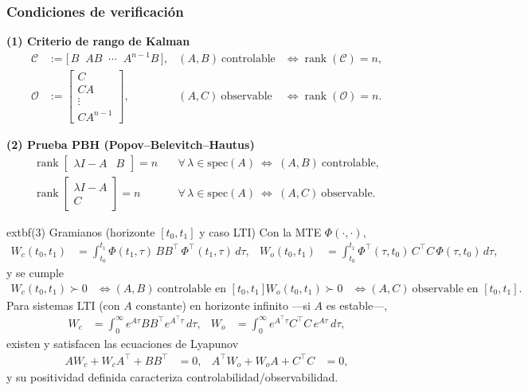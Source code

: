 \documentclass[
  11pt,
  letterpaper,
   addpoints,
   answers
  ]{exam}
\begin{document}
\begin{questions}
\begin{solution}
\subsubsection*{Condiciones de verificación}

\textbf{(1) Criterio de rango de Kalman}
\begin{align}
\mathcal C &:= \big[\,B\;\; AB\;\; \cdots\;\; A^{n-1}B\,\big], 
& (A,B)\ \text{controlable} &\iff \operatorname{rank}(\mathcal C)=n,\\[2mm]
\mathcal O &:= 
\begin{bmatrix}
C\\ CA\\ \vdots\\ CA^{n-1}
\end{bmatrix},
& (A,C)\ \text{observable} &\iff \operatorname{rank}(\mathcal O)=n.
\end{align}

\textbf{(2) Prueba PBH (Popov–Belevitch–Hautus)}
\begin{align}
\operatorname{rank}\!\begin{bmatrix}\lambda I-A & B\end{bmatrix}=n\quad 
&\forall\,\lambda\in\mathrm{spec}(A)\ \Longleftrightarrow\ (A,B)\ \text{controlable},\\[2mm]
\operatorname{rank}\!\begin{bmatrix}\lambda I-A\\ C\end{bmatrix}=n\quad 
&\forall\,\lambda\in\mathrm{spec}(A)\ \Longleftrightarrow\ (A,C)\ \text{observable}.
\end{align}

	extbf{(3) Gramianos (horizonte $[t_0,t_1]$ y caso LTI)}
Con la MTE $\Phi(\cdot,\cdot)$,
\begin{align}
W_c(t_0,t_1) &= \int_{t_0}^{t_1} \Phi(t_1,\tau)\,B B^\top\,\Phi^\top(t_1,\tau)\,d\tau, &
W_o(t_0,t_1) &= \int_{t_0}^{t_1} \Phi^\top(\tau,t_0)\,C^\top C\,\Phi(\tau,t_0)\,d\tau,
\end{align}
y se cumple
\begin{align}
W_c(t_0,t_1)\succ 0 &\iff (A,B)\ \text{controlable en }[t_0,t_1], &
W_o(t_0,t_1)\succ 0 &\iff (A,C)\ \text{observable en }[t_0,t_1].
\end{align}
Para sistemas LTI (con $A$ constante) en horizonte infinito —si $A$ es estable—,
\begin{align}
W_c &= \int_{0}^{\infty} e^{A\tau} B B^\top e^{A^\top \tau}\,d\tau, &
W_o &= \int_{0}^{\infty} e^{A^\top \tau} C^\top C\, e^{A\tau}\,d\tau,
\end{align}
existen y satisfacen las ecuaciones de Lyapunov
\begin{align}
 A W_c + W_c A^\top + B B^\top &= 0, &
 A^\top W_o + W_o A + C^\top C &= 0,
\end{align}
y su positividad definida caracteriza controlabilidad/observabilidad.


\end{solution}
\end{questions}
\end{document}
